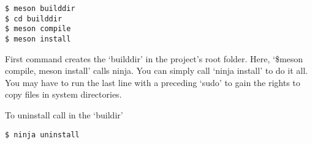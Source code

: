 \begin{verbatim}
$ meson builddir
$ cd builddir
$ meson compile
$ meson install
\end{verbatim}

First command creates the `builddir' in the project's root folder. Here, `\$meson compile, meson install' calls ninja. You can simply call `ninja install' to do it all. You may have to run the last line with a preceding `sudo' to gain the rights to copy files in system directories. 

To uninstall call in the `buildir'

\begin{verbatim}
$ ninja uninstall
\end{verbatim}


